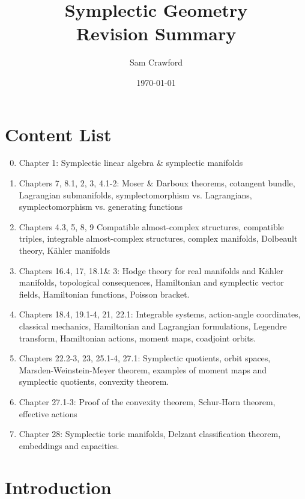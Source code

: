 \documentclass[11pt, final]{article}
\begin{document}
\title{Symplectic Geometry\\
\Large{Revision Summary}}
\author{Sam Crawford}
\date{\today}
\maketitle

\tableofcontents
\pagebreak

\section*{Content List}

\begin{enumerate}[label= Week \arabic*]
\setcounter{enumi}{-1}
	\item Chapter 1: Symplectic linear algebra \& symplectic manifolds
	\item Chapters 7, 8.1, 2, 3, 4.1-2: Moser \& Darboux theorems, cotangent bundle, Lagrangian submanifolds, symplectomorphism vs. Lagrangians, symplectomorphism vs. generating functions
	\item Chapters 4.3, 5, 8, 9 Compatible almost-complex structures, compatible triples, integrable almost-complex structures, complex manifolds, Dolbeault theory, K\"ahler manifolds
	\item Chapters 16.4, 17, 18.1\& 3: Hodge theory for real manifolds and K\"ahler manifolds, topological consequences, Hamiltonian and symplectic vector fields, Hamiltonian functions, Poisson bracket.
	\item Chapters 18.4, 19.1-4, 21, 22.1: Integrable systems, action-angle coordinates, classical mechanics, Hamiltonian and Lagrangian formulations, Legendre transform, Hamiltonian actions, moment maps, coadjoint orbits.
	\item Chapters 22.2-3, 23, 25.1-4, 27.1: Symplectic quotients, orbit spaces, Marsden-Weinstein-Meyer theorem, examples of moment maps and symplectic quotients, convexity theorem.
	\item Chapter 27.1-3: Proof of the convexity theorem, Schur-Horn theorem, effective actions
	\item Chapter 28: Symplectic toric manifolds, Delzant classification theorem, embeddings and capacities.
\end{enumerate}

\section{Introduction}
\end{document}
